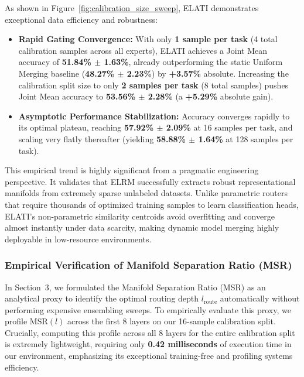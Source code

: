 As shown in Figure~\ref{fig:calibration_size_sweep}, ELATI demonstrates exceptional data efficiency and robustness:
\begin{itemize}
    \item \textbf{Rapid Gating Convergence:} With only \textbf{1 sample per task} (4 total calibration samples across all experts), ELATI achieves a Joint Mean accuracy of \textbf{51.84\% $\pm$ 1.63\%}, already outperforming the static Uniform Merging baseline (\textbf{48.27\% $\pm$ 2.23\%}) by \textbf{+3.57\%} absolute. Increasing the calibration split size to only \textbf{2 samples per task} (8 total samples) pushes Joint Mean accuracy to \textbf{53.56\% $\pm$ 2.28\%} (a \textbf{+5.29\%} absolute gain).
    \item \textbf{Asymptotic Performance Stabilization:} Accuracy converges rapidly to its optimal plateau, reaching \textbf{57.92\% $\pm$ 2.09\%} at 16 samples per task, and scaling very flatly thereafter (yielding \textbf{58.88\% $\pm$ 1.64\%} at 128 samples per task).
\end{itemize}
This empirical trend is highly significant from a pragmatic engineering perspective. It validates that ELRM successfully extracts robust representational manifolds from extremely sparse unlabeled datasets. Unlike parametric routers that require thousands of optimized training samples to learn classification heads, ELATI's non-parametric similarity centroids avoid overfitting and converge almost instantly under data scarcity, making dynamic model merging highly deployable in low-resource environments.

\subsubsection{Empirical Verification of Manifold Separation Ratio (MSR)}
\label{subsec:msr_empirical}
In Section~3, we formulated the Manifold Separation Ratio (MSR) as an analytical proxy to identify the optimal routing depth $l_{\text{route}}$ automatically without performing expensive ensembling sweeps. To empirically evaluate this proxy, we profile $\text{MSR}(l)$ across the first 8 layers on our 16-sample calibration split. Crucially, computing this profile across all 8 layers for the entire calibration split is extremely lightweight, requiring only \textbf{0.42 milliseconds} of execution time in our environment, emphasizing its exceptional training-free and profiling systems efficiency.

